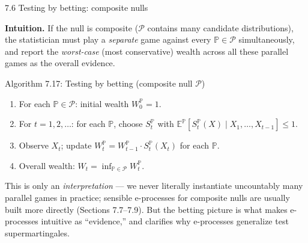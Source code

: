 \documentclass[aspectratio=169,10pt]{beamer}
\begin{document}
\begin{frame}{7.6 Testing by betting: composite nulls}

\textbf{Intuition.} If the null is composite ($\mathcal P$ contains many candidate distributions), the statistician
must play a \emph{separate} game against every $\mathbb P \in \mathcal P$ simultaneously, and report the
\emph{worst-case} (most conservative) wealth across all these parallel games as the overall evidence.

\begin{block}{Algorithm 7.17: Testing by betting (composite null $\mathcal P$)}
\begin{enumerate}
\item[1.] For each $\mathbb P \in \mathcal P$: initial wealth $W_0^{\mathbb P}=1$.
\item[2.] For $t=1,2,\dots$: for each $\mathbb P$, choose $S_t^{\mathbb P}$ with
$\mathbb E^{\mathbb P}[S_t^{\mathbb P}(X)\mid X_1,\dots,X_{t-1}]\le1$.
\item[3.] Observe $X_t$; update $W_t^{\mathbb P} = W_{t-1}^{\mathbb P}\cdot S_t^{\mathbb P}(X_t)$ for each $\mathbb P$.
\item[4.] Overall wealth: $W_t = \inf_{\mathbb P\in\mathcal P} W_t^{\mathbb P}$.
\end{enumerate}
\end{block}

This is only an \emph{interpretation} --- we never literally instantiate uncountably many parallel games in
practice; sensible e-processes for composite nulls are usually built more directly (Sections 7.7--7.9). But the
betting picture is what makes e-processes intuitive as ``evidence,'' and clarifies why e-processes generalize test
supermartingales.

\end{frame}
\end{document}
